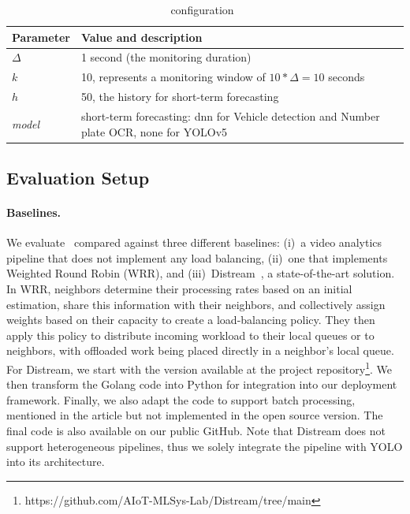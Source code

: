 \begin{table}
	\centering
	\begin{tabular}{p{1.5cm}p{6.5cm}}
    \toprule
	\textbf{Parameter} & \textbf{Value and description}                                                          \\
	\midrule
	\textbf{$\Delta$}  & 1 second (the monitoring duration)                                                      \\
	\textbf{$k$}       & 10, represents a monitoring window of $10*\Delta=10$ seconds                            \\
	\textbf{$h$}       & 50, the history for short-term forecasting                                              \\
	\textit{model}     & short-term forecasting: \acrshort{dnn} for Vehicle detection and Number plate OCR, none for YOLOv5 \\
	\bottomrule
	\end{tabular}
	\caption{\videojam{} configuration~\label{tab:configuration}}
\end{table}

\subsection{Evaluation Setup}\label{sec:setup}

\paragraph{Baselines.} We evaluate~\videojam{} compared against three different baselines: (i)~a video analytics pipeline that does not implement any load balancing, (ii)~one that implements Weighted Round Robin (WRR), and (iii)~Distream~\cite{zeng2020distream}, a state-of-the-art solution. In WRR, neighbors determine their processing rates based on an initial estimation, share this information with their neighbors, and collectively assign weights based on their capacity to create a load-balancing policy. They then apply this policy to distribute incoming workload to their local queues or to neighbors, with offloaded work being placed directly in a neighbor's local queue. For Distream, we start with the version available at the project repository\footnote{https://github.com/AIoT-MLSys-Lab/Distream/tree/main}. We then transform the Golang code into Python for integration into our deployment framework. Finally, we also adapt the code to support batch processing, mentioned in the article but not implemented in the open source version. The final code is also available on our public GitHub. Note that Distream does not support heterogeneous pipelines, thus we solely integrate the pipeline with YOLO into its architecture.

